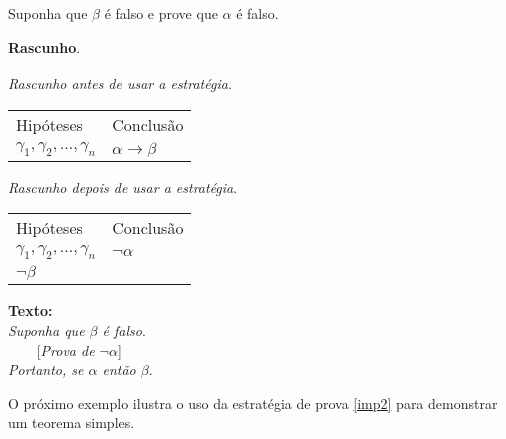 \begin{ProofStrategy}\label{imp2}
Suponha que $\beta$ é falso e prove  que $\alpha$ é falso.
\begin{flushleft}
 \textbf{Rascunho}.\\
\verb| |\\

\textit{Rascunho antes de usar a estratégia}.
\verb| |\\
\begin{tabular}{ll}
Hipóteses & Conclusão \\
$\gamma_1,\gamma_2,...,\gamma_n$ & $\alpha\to \beta$\\
\end{tabular}

\textit{Rascunho depois de usar a estratégia}.
\verb| |\\
\begin{tabular}{ll}
Hipóteses & Conclusão \\
$\gamma_1,\gamma_2,...,\gamma_n$ & $\neg\alpha$\\
$\neg\beta$                                              & \\
\end{tabular}
\end{flushleft}
\begin{flushleft}
\textbf{Texto:}\\
\textit{Suponha que $\beta$ é falso}.\\
\verb|    |[\textit{Prova de $\neg \alpha$}]\\
\textit{Portanto, se $\alpha$ então $\beta$}.
\end{flushleft}
\end{ProofStrategy}

O próximo exemplo ilustra o uso da estratégia de prova \ref{imp2} para
demonstrar um teorema simples.

